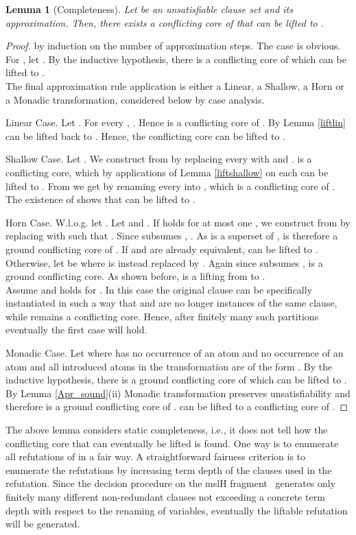 \documentclass{llncs}
\newtheorem{lem}[theorem]{Lemma}
\begin{document}
\begin{lem}[Completeness]\label{complete}
Let  be an unsatisfiable clause set and  its approximation.
Then, there exists a conflicting core of  that can be lifted to .
\end{lem}


\begin{proof}
by induction on the number  of approximation steps. The case  is obvious.
For , let .
By the inductive hypothesis, there is a conflicting core   of  which can 
be lifted to .\\
The final approximation rule application is either a Linear, a Shallow, a Horn or a Monadic transformation,
considered below by case analysis.

Linear Case. Let .
For every  , . 
Hence  
is a conflicting core of .
By Lemma \ref{liftlin}  can be lifted back to .
Hence, the conflicting core  can be lifted to .

Shallow Case. Let .
We construct  from  by replacing every   with  and .
 is a conflicting core, which by  applications of Lemma \ref{liftshallow} on each  can be lifted to .
From  we get  by renaming every  into , which is a conflicting core of .
The existence of   shows that  can be lifted to .

Horn Case. W.l.o.g. let .
Let  and .
If  holds for at most one , we construct  from  by replacing  with  such that .
Since  subsumes , .
As  is a superset of ,  is therefore a ground conflicting core of .
If  and  are already equivalent,   can be lifted to .
Otherwise, let  be  where    is instead replaced by .
Again since  subsumes ,  is a ground conflicting core. 
As shown before,  is a lifting from  to .\\
Assume  and  holds for . 
In this case the original clause  can be specifically instantiated in such a way that  and  are no longer instances of the same clause,
while  remains a conflicting core.
Hence, after finitely many such partitions eventually the first case will hold. 

Monadic Case. Let  where  has no occurrence of an atom 
 and  no occurrence of an atom  and
all introduced atoms in the transformation are of the form .
By the inductive hypothesis, there is a ground conflicting core   of  which can be lifted to .
By Lemma \ref{Apr_sound}(ii) Monadic transformation  preserves unsatisfiability and therefore  is a ground conflicting core of . 
 can be lifted to  a conflicting core of .
\end{proof}

The above lemma considers static completeness, i.e., it does not tell how the conflicting
core that can eventually be lifted is found. One way is to enumerate all refutations of  
in a fair way. A straightforward fairness criterion is to enumerate the refutations by increasing
term depth of the clauses used in the refutation. Since the decision procedure on the
mslH fragment~\cite{Weidenbach99cade} generates only finitely many different
non-redundant clauses not exceeding a concrete term depth with respect to the renaming of variables, eventually the 
liftable refutation will be generated.
\end{document}

